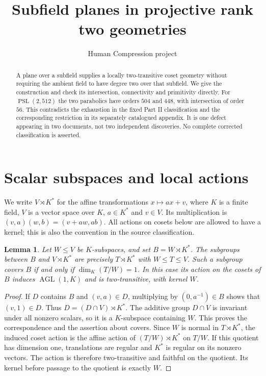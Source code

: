 \documentclass[11pt]{article}
\title{Subfield planes in projective rank two geometries}
\author{Human Compression project}
\date{}
\newtheorem{lemma}[theorem]{Lemma}
\newcommand{\PS}{\operatorname{PSL}}
\newcommand{\AG}{\operatorname{AGL}}
\begin{document}
\maketitle
\begin{abstract}
A plane over a subfield supplies a locally two-transitive coset geometry
without requiring the ambient field to have degree two over that subfield.
We give the construction and check its intersection, connectivity and
primitivity directly. For $\PS(2,512)$ the two parabolics have orders $504$
and $448$, with intersection of order $56$. This contradicts the exhaustion
in the fixed Part II classification and the corresponding restriction in
its separately catalogued appendix. It is one defect appearing in two
documents, not two independent discoveries. No complete corrected
classification is asserted.
\end{abstract}

\section{Scalar subspaces and local actions}
We write $V\rtimes K^*$ for the affine transformations $x\mapsto ax+v$,
where $K$ is a finite field, $V$ is a vector space over $K$, $a\in K^*$
and $v\in V$. Its multiplication is
$(v,a)(w,b)=(v+aw,ab)$. All actions on cosets below are allowed to have
a kernel; this is also the convention in the source classification.

\begin{lemma}\label{scalar}
Let $W\leq V$ be $K$-subspaces, and set $B=W\rtimes K^*$.
The subgroups between $B$ and $V\rtimes K^*$ are precisely
$T\rtimes K^*$ with $W\leq T\leq V$. Such a subgroup covers $B$ if
and only if $\dim_K(T/W)=1$. In this case its action on the cosets of
$B$ induces $\AG(1,K)$ and is two-transitive, with kernel $W$.
\end{lemma}
\begin{proof}
If $D$ contains $B$ and $(v,a)\in D$, multiplying by $(0,a^{-1})\in B$
shows that $(v,1)\in D$. Thus $D=(D\cap V)\rtimes K^*$.
The additive group $D\cap V$ is invariant under all nonzero scalars,
so it is a $K$-subspace containing $W$. This proves the correspondence
and the assertion about covers. Since $W$ is normal in $T\rtimes K^*$,
the induced coset action is the affine action of
$(T/W)\rtimes K^*$ on $T/W$. If this quotient has dimension one,
translations are regular and $K^*$ is regular on its nonzero vectors.
The action is therefore two-transitive and faithful on the quotient.
Its kernel before passage to the quotient is exactly $W$.
\end{proof}
\end{document}
